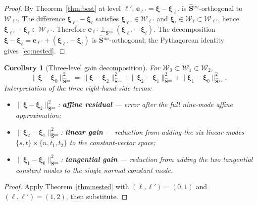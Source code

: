 \documentclass[11pt,a4paper]{article}
\newtheorem{corollary}[theorem]{Corollary}
\theoremstyle{definition}
\newcommand{\Schur}{\mathbf{S}}
\newcommand{\Shatuu}{\widehat{\Schur}{}^{uu}}
\newcommand{\Wspace}{\mathcal{W}}
\begin{document}
\begin{proof}
  By Theorem~\ref{thm:best} at level $\ell'$,
  $\bm{e}_{\ell'} = \bm{\xi} - \bm{\xi}_{\ell'}$ is
  $\Shatuu$-orthogonal to $\Wspace_{\ell'}$.
  The difference $\bm{\xi}_{\ell'} - \bm{\xi}_\ell$ satisfies
  $\bm{\xi}_{\ell'} \in \Wspace_{\ell'}$ and
  $\bm{\xi}_\ell \in \Wspace_\ell \subset \Wspace_{\ell'}$,
  hence $\bm{\xi}_{\ell'} - \bm{\xi}_\ell \in \Wspace_{\ell'}$.
  Therefore $\bm{e}_{\ell'} \perp_{\Shatuu}
  (\bm{\xi}_{\ell'} - \bm{\xi}_\ell)$.
  The decomposition
  $\bm{\xi} - \bm{\xi}_\ell = \bm{e}_{\ell'} +
   (\bm{\xi}_{\ell'} - \bm{\xi}_\ell)$
  is $\Shatuu$-orthogonal; the Pythagorean identity gives~\eqref{eq:nested}.
\end{proof}

\begin{corollary}[Three-level gain decomposition]\label{cor:gains}
  For $\Wspace_0 \subset \Wspace_1 \subset \Wspace_2$,
  \begin{equation}\label{eq:gains}
    \|\bm{\xi} - \bm{\xi}_0\|_{\Shatuu}^2
    = \|\bm{\xi} - \bm{\xi}_2\|_{\Shatuu}^2
      + \|\bm{\xi}_2 - \bm{\xi}_1\|_{\Shatuu}^2
      + \|\bm{\xi}_1 - \bm{\xi}_0\|_{\Shatuu}^2.
  \end{equation}
  Interpretation of the three right-hand-side terms:
  \begin{itemize}
    \item $\|\bm{\xi} - \bm{\xi}_2\|_{\Shatuu}^2$:
      \textbf{affine residual} --- error after the full nine-mode
      affine approximation;
    \item $\|\bm{\xi}_2 - \bm{\xi}_1\|_{\Shatuu}^2$:
      \textbf{linear gain} --- reduction from adding the six linear
      modes $\{s,t\}\times\{n,t_1,t_2\}$ to the constant-vector space;
    \item $\|\bm{\xi}_1 - \bm{\xi}_0\|_{\Shatuu}^2$:
      \textbf{tangential gain} --- reduction from adding the two
      tangential constant modes to the single normal constant mode.
  \end{itemize}
\end{corollary}

\begin{proof}
  Apply Theorem~\ref{thm:nested} with $(\ell,\ell')=(0,1)$ and
  $(\ell,\ell')=(1,2)$, then substitute.
\end{proof}
\end{document}

